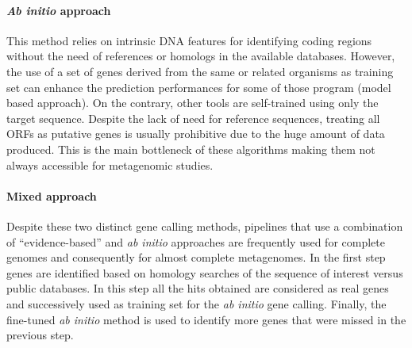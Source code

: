 \paragraph{\textit{Ab initio} approach}
This method relies on intrinsic DNA features for identifying coding regions without the need of references or homologs in the available databases. However, the use of a set of genes derived from the same or related organisms as training set can enhance the prediction performances for some of those program (model based approach). On the contrary, other  tools are self-trained using only the target sequence. Despite the lack of need for reference sequences, treating all ORFs as putative genes is usually prohibitive due to the huge amount of data produced. This is the main bottleneck of these algorithms making them not always accessible for metagenomic studies.\\%

\paragraph{Mixed approach}
Despite these two distinct gene calling methods, pipelines that use a combination of ``evidence-based'' and \textit{ab initio} approaches are frequently used for complete genomes and consequently for almost complete metagenomes. In the first step genes are identified based on homology searches of the sequence of interest versus public databases. In this step all the hits obtained are considered as real genes and successively used as training set for the \textit{ab initio} gene calling. Finally, the fine-tuned \textit{ab initio} method is used to identify more genes that were missed in the previous step.\\%

